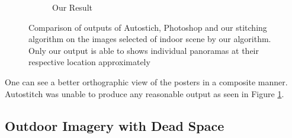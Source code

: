 \begin{figure}
\begin{subfigure}[b]{0.3\textwidth}
\caption{Our Result}
\end{subfigure}
\caption{Comparison of outputs of Autostich, Photoshop and our stitching
algorithm on the images selected of indoor scene by our algorithm. Only our
output is able to shows individual panoramas at their respective location
approximately}
\label{fig:idc_indoor_comparison}
\end{figure}

One can see a better orthographic view of the posters in a composite
manner. Autostitch was unable to produce any reasonable output as seen in
Figure \ref{fig:idc_indoor_comparison}.

\subsection{Outdoor Imagery with Dead Space}


